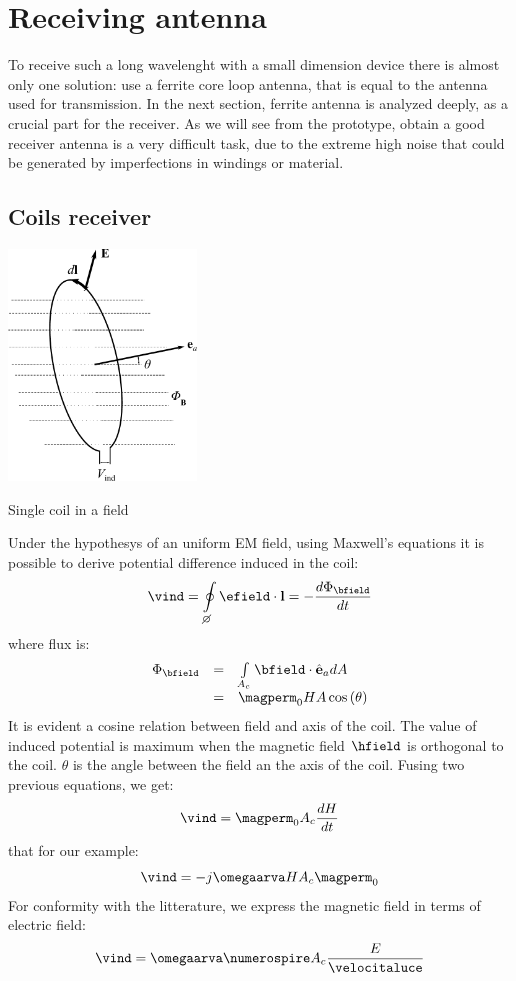 \section{Receiving antenna}

To receive such a long wavelenght with a small dimension device there is almost only one solution: use a ferrite core loop antenna, that is equal to the antenna used for transmission. In the next section, ferrite antenna is analyzed deeply, as a crucial part for the receiver. As we will see from the prototype, obtain a good receiver antenna is a very difficult task, due to the extreme high noise that could be generated by imperfections in windings or material.

\subsection{Coils receiver}

\begin{marginfigure}
	\centering
	\includegraphics[width=5cm]{ch2/img/spira_singola.pdf}
	\caption{Single coil in a field}
\end{marginfigure}
Under the hypothesys of an uniform EM field, using Maxwell's equations it is possible to derive potential difference induced in the coil:
\begin{equation}
\label{eq:tensioneindotta}
\vind = \oint\limits_{\diameter}\efield\cdot\mathbf{l} = -\dfrac{d\Phi_{\bfield}}{dt}
\end{equation}
where flux is:
\begin{equation}
\begin{array}{rcl}
\Phi_{\bfield} & = & \int\limits_{A_c} \bfield \cdot \hat{\mathbf{e}}_a dA \\
 & = & \magperm_0 H A \ccos{\theta}
\end{array}
\end{equation}
It is evident a cosine relation between field and axis of the coil. The value of induced potential is maximum when the magnetic field $\hfield$ is orthogonal to the coil. $\theta$ is the angle between the field an the axis of the coil. Fusing two previous equations, we get:
\[
\vind = \magperm_0 A_c \dfrac{dH}{dt}
\]
that for our example:
\[
\vind = -j \omegaarva H A_c \magperm_0
\]
For conformity with the litterature, we express the magnetic field in terms of electric field:
\begin{equation}
\vind = \omegaarva \numerospire A_c \dfrac{E}{\velocitaluce}
\end{equation}

